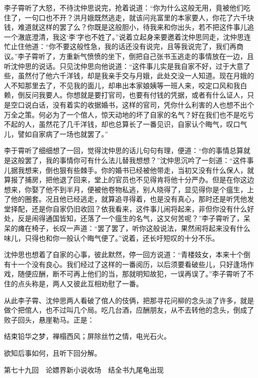 \documentclass[12pt,UTF8]{ctexbook}
\begin{document}
{{{李子霄听了大怒，不待沈仲思说完，抢着说道：“你为什么这般无用，竟被他们吃住了，一句口也不开？洪月娥既然逃走，就该问兆富里的本家要人，你花了六千块钱，难道就这样的罢了么？你既是这般胆小，待我来和你出头，若不把这件事儿追一个澈底澄清，我这‘李’字也不姓了。”说着立起身来要邀着沈仲思同走，沈仲思连忙止住他道：“你不要这般性急，我的话还没有说完，且等我说完了，我们再商议。”李子霄听了，方重新气愤愤的坐下，倒把自己张书玉逃走的事情放在一边，且听沈仲思的说话。只见沈仲思向他说道：“这件事儿实是我自家不好，过于大意了些，虽然付了他六千洋钱，却是我亲手交与月娥，此处交没一人知道。现在月娥的人不知那里去了，不见我的面儿，却串出本家娘姨等一班人来，咬定口风和我白赖，倒反问我要人。你想就是要打官司，也要有付钱的凭据，或者有什么证人，只是空口说白话，没有着实的收据婚书，这样的官司，凭你什么利害的人也想不出个万全之策。何必为了一个倌人，惊天动地的坏了自家的名气？好在我们也不是吃亏不起的人，虽然花了几千洋钱，却也总算长了一番见识，自家认个晦气，叹口气儿，譬如自家病了一场也就罢了。”

李于霄听了细细想了一回，觉得沈仲思的话儿句句有理，便道：“你的事情总算就是这般罢了，我的事情你可有什么法儿替我想想？”沈仲思沉吟了一刻道：“这件事儿据我想来，倒也狠有些棘手。你的婚书已经被他带走，当初又没有什么保人，就算报了捕房，把他退了回来，堂上的官员也不见得肯将他十分严办。但是在你这边想来，你娶了他不到半月，便被他卷物私逃，别人晓得了，显见得你是个瘟生，上了他的圈套。况且他已经逃走，就算追寻得着，也是没有真心，那时还是听凭他发堂择配，还是你自家仍旧收回？依我看来，这件事儿闹将起来，非但你没有什么好处，反是闹得通国皆知，还落了一个瘟生的名气，这又何苦呢？”李子霄听了，呆呆的瘫在椅子，长叹一声道：“罢了罢了，听你这般说法，果然闹将起来没有什么味儿，只得也和你一般认个晦气便了。”说着，还长吁短叹的十分不乐。

沈仲思也想着了自家的心事，彼此默然，停一回方说道：“青楼妓女，本来十个倒有十一个没有良心。我们经过了这样的一番阅历，以后须要看破些儿，只好逢场作戏，随便应酬，断不可再上他们的当，那就明知故犯，一误再误了。”李子霄听了不住的点头称是，两人又彼此互相劝慰了一番。

从此李子霄、沈仲思两人看破了倌人的伎俩，把那寻花问柳的念头淡了许多，就是做个把倌人，也不过叫几个局。吃几台酒，应酬朋友，从不去转他的念头，倒成了败子回头，悬崖勒马。正是：

结束铅华之梦，禅榻西风；屏除丝竹之情，电光石火。

欲知后事如何，且听下回分解。





第七十九回　论嫖界新小说收场　结全书九尾龟出现





}}}
\end{document}
